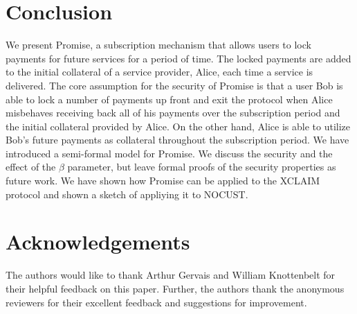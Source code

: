 \documentclass[runningheads]{llncs}
\newcommand{\sys}{Promise\xspace}
\newcommand{\todom}[1]{\todo[linecolor=green,backgroundcolor=green!25,bordercolor=green,inline,caption={}]{Todo for Dominik: #1}}
\begin{document}


\section{Conclusion}
\label{sec:conclusion}

We present \sys, a subscription mechanism that allows users to lock payments for future services for a period of time.
The locked payments are added to the initial collateral of a service provider, Alice, each time a service is delivered.
The core assumption for the security of \sys is that a user Bob is able to lock a number of payments up front and exit the protocol when Alice misbehaves receiving back all of his payments over the subscription period and the initial collateral provided by Alice.
On the other hand, Alice is able to utilize Bob's future payments as collateral throughout the subscription period.
We have introduced a semi-formal model for \sys.
We discuss the security and the effect of the $\beta$ parameter, but leave formal proofs of the security properties as future work.
We have shown how \sys can be applied to the XCLAIM protocol and shown a sketch of appliying it to NOCUST.

\section*{Acknowledgements}
The authors would like to thank Arthur Gervais and William Knottenbelt for their helpful feedback on this paper. Further, the authors thank the anonymous reviewers for their excellent feedback and suggestions for improvement.
\end{document}
